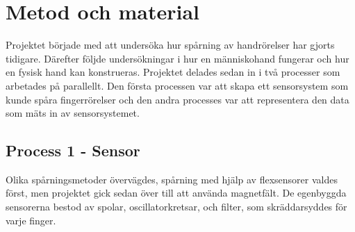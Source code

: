 \documentclass[a4paper]{article}
\begin{document}
\begin{sloppypar}
    \newpage
    \section{Metod och material}


    Projektet började med att undersöka hur spårning av handrörelser har gjorts tidigare.
    Därefter följde undersökningar i hur en människohand fungerar och hur en fysisk hand kan konstrueras.
    Projektet delades sedan in i två processer som arbetades på parallellt. Den första processen var att skapa ett sensorsystem som kunde spåra fingerrörelser
    och den andra processes var att representera den data som mäts in av sensorsystemet.

    \subsection{Process 1 - Sensor}
    Olika spårningsmetoder övervägdes, spårning med hjälp av flexsensorer valdes först, men projektet gick sedan över till att använda magnetfält.
    De egenbyggda sensorerna bestod av spolar, oscillatorkretsar, och filter, som skräddarsyddes för varje finger.




\end{sloppypar}
\end{document}
